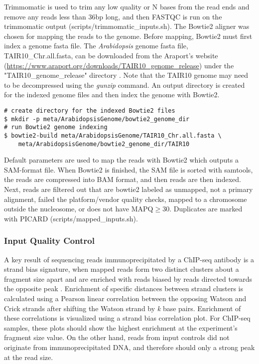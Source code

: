 \documentclass{article}
\begin{document}
\begin{sloppypar}
Trimmomatic is used to trim any low quality or N bases from the read ends and remove any reads less than 36bp long, and then FASTQC is run on the trimmomatic output ({\selectfont scripts/trimmomatic\_inputs.sh}). The Bowtie2 aligner was chosen for mapping the reads to the genome. Before mapping, Bowtie2 must first index a  genome fasta file. The \emph{Arabidopsis} genome fasta file, TAIR10\_Chr.all.fasta, can be downloaded from the Araport's website (\url{https://www.araport.org/downloads/TAIR10_genome_release}) under the "TAIR10\_genome\_release" directory \cite{Araport11}. Note that the TAIR10 genome may need to be decompressed  using the \emph{gunzip} command. An output directory is created for the indexed genome files and then index the genome with Bowtie2.

\begin{verbatim}
# create directory for the indexed Bowtie2 files
$ mkdir -p meta/ArabidopsisGenome/bowtie2_genome_dir
# run Bowtie2 genome indexing
$ bowtie2-build meta/ArabidopsisGenome/TAIR10_Chr.all.fasta \
    meta/ArabidopsisGenome/bowtie2_genome_dir/TAIR10
\end{verbatim}

Default parameters are used to map the reads with Bowtie2 which outputs a SAM-format file. When Bowtie2 is finished, the SAM file is sorted with samtools, the reads are compressed into BAM format, and then reads are then indexed. Next, reads are filtered out that are bowtie2 labeled as unmapped, not a primary alignment, failed the platform/vendor quality checks, mapped to a chromosome outside the nucleosome, or does not have MAPQ$\geq$30. Duplicates are marked with PICARD  ({\selectfont scripts/mapped\_inputs.sh}).

\subsubsection{Input Quality Control}

A key result of sequencing reads immunoprecipitated by a ChIP-seq antibody is a strand bias signature, when mapped reads form two distinct clusters about a fragment size apart and are enriched with reads biased by reads directed towards the opposite peak \cite{Landt2012}. Enrichment of specific distances between strand clusters is calculated using a Pearson linear correlation between the opposing Watson and Crick strands after shifting the Watson strand by \textit{k} base pairs. Enrichment of these correlations is visualized using a strand bias correlation plot. For ChIP-seq samples, these plots should show the highest enrichment at the experiment's fragment size value. On the other hand, reads from input controls did not originate from immunoprecipitated DNA, and therefore should only a strong peak at the read size.  



\end{sloppypar}
\end{document}
